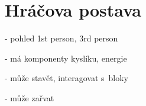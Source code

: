 
\section{Hráčova postava}

- pohled 1st person, 3rd person

- má komponenty kyslíku, energie

- může stavět, interagovat s~bloky

- může zařvat
